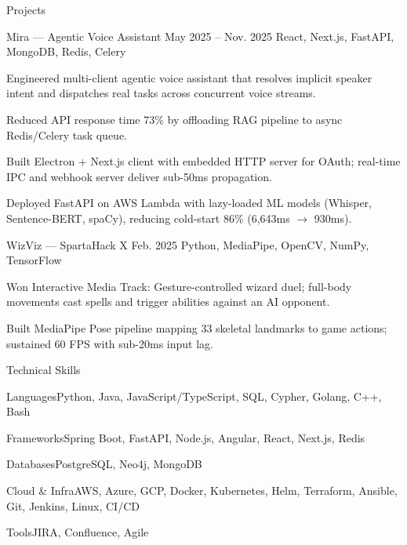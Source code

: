 \documentclass[
	11pt
]{../../../resume}
\begin{document}
	\begin{rSection}{P}{rojects}
		\begin{rSectionEntry}
			{Mira --- Agentic Voice Assistant}
			{May 2025 -- Nov. 2025}
			{}
			{React, Next.js, FastAPI, MongoDB, Redis, Celery}
			{}

			\item Engineered multi-client agentic voice assistant that resolves implicit speaker intent and dispatches real tasks across concurrent voice streams.
			\item Reduced API response time 73\% by offloading RAG pipeline to async Redis/Celery task queue.
			\item Built Electron + Next.js client with embedded HTTP server for OAuth; real-time IPC and webhook server deliver sub-50ms propagation.
			\item Deployed FastAPI on AWS Lambda with lazy-loaded ML models (Whisper, Sentence-BERT, spaCy), reducing cold-start 86\% (6{,}643ms $\rightarrow$ 930ms).
		\end{rSectionEntry}

		\begin{rSectionEntry}
			{WizViz --- SpartaHack X}
			{Feb. 2025}
			{}
			{Python, MediaPipe, OpenCV, NumPy, TensorFlow}
			{}

			\item Won Interactive Media Track: Gesture-controlled wizard duel; full-body movements cast spells and trigger abilities against an AI opponent.
			\item Built MediaPipe Pose pipeline mapping 33 skeletal landmarks to game actions; sustained 60 FPS with sub-20ms input lag.
		\end{rSectionEntry}
	\end{rSection}

	\begin{rSection}{T}{echnical Skills}
		\begin{rSet}{Languages}{Python, Java, JavaScript/TypeScript, SQL, Cypher, Golang, C++, Bash}
		\end{rSet}
		\begin{rSet}{Frameworks}{Spring Boot, FastAPI, Node.js, Angular, React, Next.js, Redis}
		\end{rSet}
		\begin{rSet}{Databases}{PostgreSQL, Neo4j, MongoDB}
		\end{rSet}
		\begin{rSet}{Cloud \& Infra}{AWS, Azure, GCP, Docker, Kubernetes, Helm, Terraform, Ansible, Git, Jenkins, Linux, CI/CD}
		\end{rSet}
		\begin{rSet}{Tools}{JIRA, Confluence, Agile}
		\end{rSet}
	\end{rSection}
\end{document}
